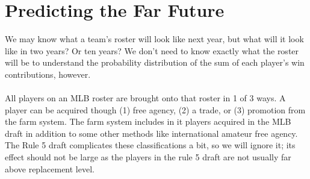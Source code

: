 \documentclass[11pt]{article}
\begin{document}
\section{Predicting the Far Future}

We may know what a team's roster will look like next year, but what will it look like in two years? Or ten years? We don't need to know exactly what the roster will be to understand the probability distribution of the sum of each player's win contributions, however.\\\\
All players on an MLB roster are brought onto that roster in 1 of 3 ways. A player can be acquired though (1) free agency, (2) a trade, or (3) promotion from the farm system. The farm system includes in it players acquired in the MLB draft in addition to some other methods like international amateur free agency. The Rule 5 draft complicates these classifications a bit, so we will ignore it; its effect should not be large as the players in the rule 5 draft are not usually far above replacement level.
\end{document}
